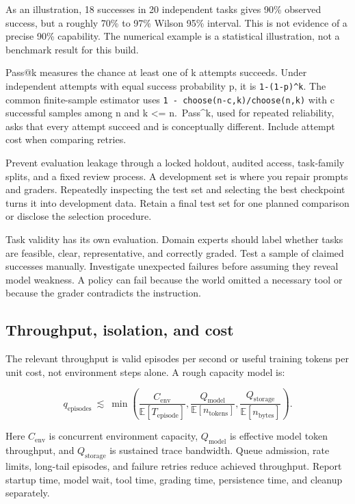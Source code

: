 \documentclass[
  11pt,
  letterpaper,
]{article}
\begin{document}
As an illustration, 18 successes in 20 independent tasks gives 90\%
observed success, but a roughly 70\% to 97\% Wilson 95\% interval. This
is not evidence of a precise 90\% capability. The numerical example is a
statistical illustration, not a benchmark result for this build.

Pass@k measures the chance at least one of k attempts succeeds. Under
independent attempts with equal success probability p, it is
\texttt{1-(1-p)\^{}k}. The common finite-sample estimator uses
\texttt{1\ -\ choose(n-c,k)/choose(n,k)} with c successful samples among
n and k \textless= n.~Pass\^{}k, used for repeated reliability, asks
that every attempt succeed and is conceptually different. Include
attempt cost when comparing retries.

Prevent evaluation leakage through a locked holdout, audited access,
task-family splits, and a fixed review process. A development set is
where you repair prompts and graders. Repeatedly inspecting the test set
and selecting the best checkpoint turns it into development data. Retain
a final test set for one planned comparison or disclose the selection
procedure.

Task validity has its own evaluation. Domain experts should label
whether tasks are feasible, clear, representative, and correctly graded.
Test a sample of claimed successes manually. Investigate unexpected
failures before assuming they reveal model weakness. A policy can fail
because the world omitted a necessary tool or because the grader
contradicts the instruction.

\subsection{Throughput, isolation, and
cost}\label{throughput-isolation-and-cost}

The relevant throughput is valid episodes per second or useful training
tokens per unit cost, not environment steps alone. A rough capacity
model is:

\[q_{\mathrm{episodes}}\ \lesssim\ \min\left(\frac{C_{\mathrm{env}}}{\mathbb{E}[T_{\mathrm{episode}}]},\frac{Q_{\mathrm{model}}}{\mathbb{E}[n_{\mathrm{tokens}}]},\frac{Q_{\mathrm{storage}}}{\mathbb{E}[n_{\mathrm{bytes}}]}\right).\]

Here \(C_{\mathrm{env}}\) is concurrent environment capacity,
\(Q_{\mathrm{model}}\) is effective model token throughput, and
\(Q_{\mathrm{storage}}\) is sustained trace bandwidth. Queue admission,
rate limits, long-tail episodes, and failure retries reduce achieved
throughput. Report startup time, model wait, tool time, grading time,
persistence time, and cleanup separately.
\end{document}

